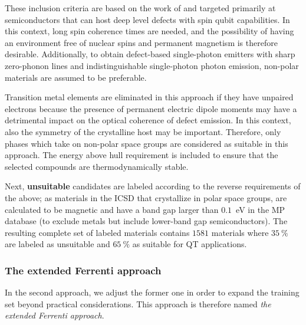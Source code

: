 \documentclass[superscriptaddress,unsortedaddress,
 amsmath,amssymb,
 aps,
]{revtex4-2}
\begin{document}
These inclusion criteria are based on the work of \citeauthor{Weber2010} \cite{Weber2010} and targeted primarily at semiconductors that can host deep level defects with spin qubit capabilities. In this context, long spin coherence times are needed, and the possibility of having an environment free of nuclear spins and permanent magnetism is therefore desirable. Additionally, to obtain defect-based single-photon emitters with sharp zero-phonon lines and indistinguishable single-photon photon emission, non-polar materials are assumed to be preferable. 

Transition metal elements are eliminated in this approach if they have unpaired electrons because the presence of permanent electric dipole moments may have a detrimental impact on the optical coherence of defect emission. In this context, also the symmetry of the crystalline host may be important. Therefore, only phases which take on non-polar space groups are considered as suitable in this approach. 
The energy above hull requirement is included to ensure that the selected compounds are thermodynamically stable. 

Next, \textbf{unsuitable} candidates are labeled according to the reverse requirements of the above; as materials in the ICSD \cite{Allen1987,Zagorac2019} 
that crystallize in polar space groups, are calculated to be magnetic and have a band gap larger than $0.1$~eV in the MP database (to exclude metals but include lower-band gap semiconductors). 
The resulting complete set of labeled materials contains $1581$ materials where $35 \ \%$
are labeled as unsuitable and 
$65 \ \%$ as suitable for QT applications.  


\subsubsection*{The extended Ferrenti approach}
In the second approach, we adjust the former one in order to expand the training set beyond practical considerations. This approach is therefore named \emph{the extended Ferrenti approach}. 
\end{document}
